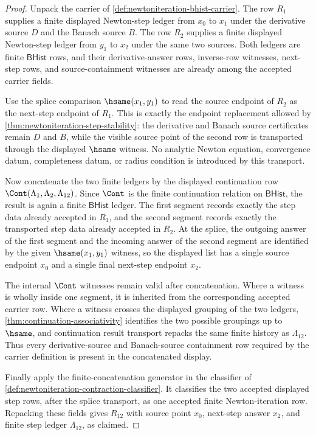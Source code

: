 \begin{proof}
Unpack the carrier of \autoref{def:newtoniteration-bhist-carrier}. The row $R_1$ supplies a finite displayed Newton-step ledger from $x_0$ to $x_1$ under the derivative source $D$ and the Banach source $B$. The row $R_2$ supplies a finite displayed Newton-step ledger from $y_1$ to $x_2$ under the same two sources. Both ledgers are finite $\mathsf{BHist}$ rows, and their derivative-answer rows, inverse-row witnesses, next-step rows, and source-containment witnesses are already among the accepted carrier fields.

Use the splice comparison $\hsame(x_1,y_1)$ to read the source endpoint of $R_2$ as the next-step endpoint of $R_1$. This is exactly the endpoint replacement allowed by \autoref{thm:newtoniteration-step-stability}: the derivative and Banach source certificates remain $D$ and $B$, while the visible source point of the second row is transported through the displayed $\hsame$ witness. No analytic Newton equation, convergence datum, completeness datum, or radius condition is introduced by this transport.

Now concatenate the two finite ledgers by the displayed continuation row $\Cont(\Lambda_1,\Lambda_2,\Lambda_{12})$. Since $\Cont$ is the finite continuation relation on $\mathsf{BHist}$, the result is again a finite $\mathsf{BHist}$ ledger. The first segment records exactly the step data already accepted in $R_1$, and the second segment records exactly the transported step data already accepted in $R_2$. At the splice, the outgoing answer of the first segment and the incoming answer of the second segment are identified by the given $\hsame(x_1,y_1)$ witness, so the displayed list has a single source endpoint $x_0$ and a single final next-step endpoint $x_2$.

The internal $\Cont$ witnesses remain valid after concatenation. Where a witness is wholly inside one segment, it is inherited from the corresponding accepted carrier row. Where a witness crosses the displayed grouping of the two ledgers, \autoref{thm:continuation-associativity} identifies the two possible groupings up to $\hsame$, and continuation result transport repacks the same finite history as $\Lambda_{12}$. Thus every derivative-source and Banach-source containment row required by the carrier definition is present in the concatenated display.

Finally apply the finite-concatenation generator in the classifier of \autoref{def:newtoniteration-contraction-classifier}. It classifies the two accepted displayed step rows, after the splice transport, as one accepted finite Newton-iteration row. Repacking these fields gives $R_{12}$ with source point $x_0$, next-step answer $x_2$, and finite step ledger $\Lambda_{12}$, as claimed.
\end{proof}

